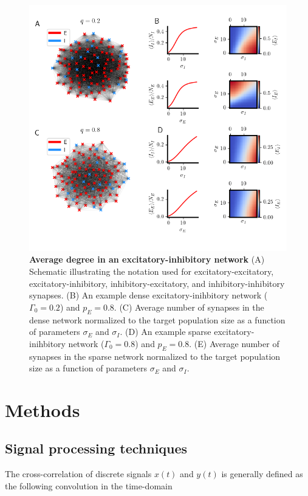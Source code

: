\documentclass{ucetd}
\begin{document}
\clearpage
\begin{figure}[t!]
\centering
\includegraphics[width=165mm]{figure-9}
\caption{\textbf{Average degree in an excitatory-inhibitory network} (A) Schematic illustrating the notation used for excitatory-excitatory, excitatory-inhibitory, inhibitory-excitatory, and inhibitory-inhibitory synapses. (B) An example dense excitatory-inihbitory network ($\Gamma_{0}=0.2$) and $p_{E} = 0.8$. (C) Average number of synapses in the dense network normalized to the target population size as a function of parameters $\sigma_{E}$ and $\sigma_{I}$. (D) An example sparse excitatory-inihbitory network ($\Gamma_{0}=0.8$) and $p_{E} = 0.8$. (E) Average number of synapses in the sparse network normalized to the target population size as a function of parameters $\sigma_{E}$ and $\sigma_{I}$.}
\end{figure}


\section{Methods}


\subsection{Signal processing techniques}

The cross-correlation of discrete signals $x(t)$ and $y(t)$ is generally defined as the following convolution in the time-domain
\end{document}
